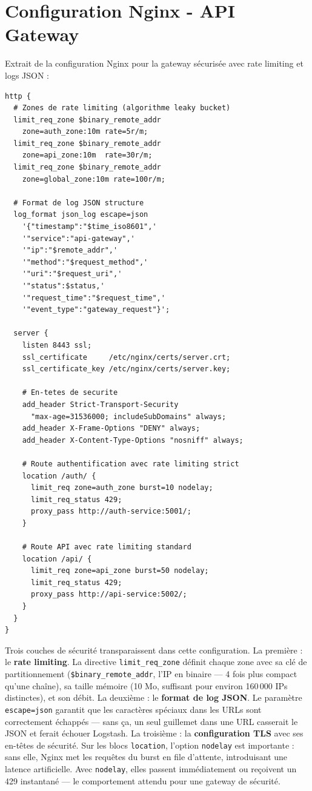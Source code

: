 \documentclass[12pt, a4paper]{report}
\begin{document}
\chapter{Configuration Nginx - API Gateway}

Extrait de la configuration Nginx pour la gateway sécurisée avec rate limiting et logs JSON :

\begin{lstlisting}[style=yaml, caption={Extrait nginx.conf * zones de rate limiting et en-têtes de sécurité}]
http {
  # Zones de rate limiting (algorithme leaky bucket)
  limit_req_zone $binary_remote_addr
    zone=auth_zone:10m rate=5r/m;
  limit_req_zone $binary_remote_addr
    zone=api_zone:10m  rate=30r/m;
  limit_req_zone $binary_remote_addr
    zone=global_zone:10m rate=100r/m;

  # Format de log JSON structure
  log_format json_log escape=json
    '{"timestamp":"$time_iso8601",'
    '"service":"api-gateway",'
    '"ip":"$remote_addr",'
    '"method":"$request_method",'
    '"uri":"$request_uri",'
    '"status":$status,'
    '"request_time":"$request_time",'
    '"event_type":"gateway_request"}';

  server {
    listen 8443 ssl;
    ssl_certificate     /etc/nginx/certs/server.crt;
    ssl_certificate_key /etc/nginx/certs/server.key;

    # En-tetes de securite
    add_header Strict-Transport-Security
      "max-age=31536000; includeSubDomains" always;
    add_header X-Frame-Options "DENY" always;
    add_header X-Content-Type-Options "nosniff" always;

    # Route authentification avec rate limiting strict
    location /auth/ {
      limit_req zone=auth_zone burst=10 nodelay;
      limit_req_status 429;
      proxy_pass http://auth-service:5001/;
    }

    # Route API avec rate limiting standard
    location /api/ {
      limit_req zone=api_zone burst=50 nodelay;
      limit_req_status 429;
      proxy_pass http://api-service:5002/;
    }
  }
}
\end{lstlisting}

\medskip
Trois couches de sécurité transparaissent dans cette configuration. La première : le \textbf{rate limiting}. La directive \texttt{limit\_req\_zone} définit chaque zone avec sa clé de partitionnement (\texttt{\$binary\_remote\_addr}, l'IP en binaire — 4 fois plus compact qu'une chaîne), sa taille mémoire (10 Mo, suffisant pour environ 160\,000 IPs distinctes), et son débit. La deuxième : le \textbf{format de log JSON}. Le paramètre \texttt{escape=json} garantit que les caractères spéciaux dans les URLs sont correctement échappés — sans ça, un seul guillemet dans une URL casserait le JSON et ferait échouer Logstash. La troisième : la \textbf{configuration TLS} avec ses en-têtes de sécurité. Sur les blocs \texttt{location}, l'option \texttt{nodelay} est importante : sans elle, Nginx met les requêtes du burst en file d'attente, introduisant une latence artificielle. Avec \texttt{nodelay}, elles passent immédiatement ou reçoivent un 429 instantané — le comportement attendu pour une gateway de sécurité.
\end{document}
